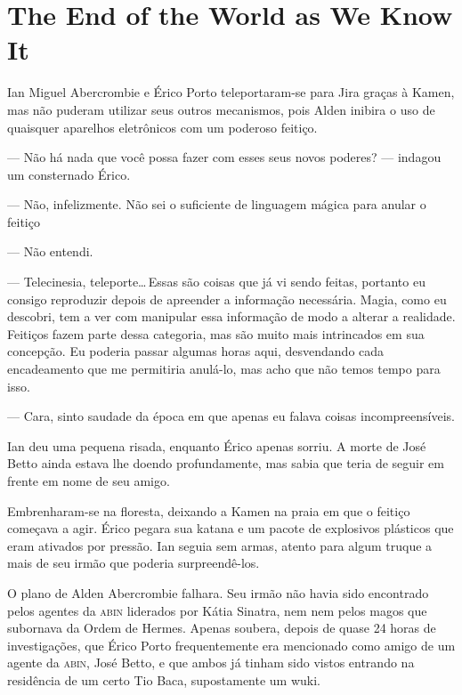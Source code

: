 \chapter{\foreignlanguage{english}{The End of the World as We Know It}}

Ian Miguel Abercrombie e Érico Porto teleportaram-se para Jira graças à
Kamen, mas não puderam utilizar seus outros mecanismos, pois Alden
inibira o uso de quaisquer aparelhos eletrônicos com um poderoso
feitiço.

--- Não há nada que você possa fazer com esses seus novos poderes? ---
indagou um consternado Érico.

--- Não, infelizmente. Não sei o suficiente de linguagem mágica para
anular o feitiço

--- Não entendi.

--- Telecinesia, teleporte\ldots\,Essas são coisas que já vi sendo
feitas, portanto eu consigo reproduzir depois de apreender a informação
necessária. Magia, como eu descobri, tem a ver com manipular essa
informação de modo a alterar a realidade. Feitiços fazem parte dessa
categoria, mas são muito mais intrincados em sua concepção. Eu poderia
passar algumas horas aqui, desvendando cada encadeamento que me
permitiria anulá-lo, mas acho que não temos tempo para isso.

--- Cara, sinto saudade da época em que apenas eu falava coisas
incompreensíveis.

Ian deu uma pequena risada, enquanto Érico apenas sorriu. A morte de
José Betto ainda estava lhe doendo profundamente, mas sabia que teria de
seguir em frente em nome de seu amigo.

Embrenharam-se na floresta, deixando a Kamen na praia em que o feitiço
começava a agir. Érico pegara sua katana e um pacote de explosivos
plásticos que eram ativados por pressão. Ian seguia sem armas, atento
para algum truque a mais de seu irmão que poderia surpreendê-los.

\espaco


O plano de Alden Abercrombie falhara. Seu irmão não havia sido
encontrado pelos agentes da \textsc{abin} liderados por Kátia Sinatra,
nem nem pelos magos que subornava da Ordem de Hermes. Apenas soubera,
depois de quase 24 horas de investigações, que Érico Porto
frequentemente era mencionado como amigo de um agente da \textsc{abin},
José Betto, e que ambos já tinham sido vistos entrando na residência de
um certo Tio Baca, supostamente um wuki.


